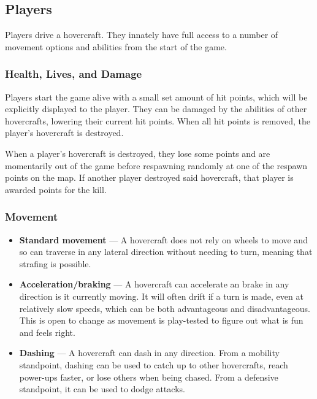 \documentclass{article}
\theoremstyle{definition}
\begin{document}
\subsection{Players}

Players drive a hovercraft. They innately have full access to a number of
movement options and abilities from the start of the game.

\subsubsection{Health, Lives, and Damage}

Players start the game alive with a small set amount of hit points, which will
be explicitly displayed to the player. They can be damaged by the abilities of
other hovercrafts, lowering their current hit points. When all hit points is
removed, the player's hovercraft is destroyed.

When a player's hovercraft is destroyed, they lose some points and are
momentarily out of the game before respawning randomly at one of the respawn
points on the map. If another player destroyed said hovercraft, that player is
awarded points for the kill.

\subsubsection{Movement}

\begin{itemize}
  \item \textbf{Standard movement} --- A hovercraft does not rely on wheels to
    move and so can traverse in any lateral direction without needing to turn,
    meaning that strafing is possible.
  \item \textbf{Acceleration/braking} --- A hovercraft can accelerate an brake
    in any direction is it currently moving. It will often drift if a turn is
    made, even at relatively slow speeds, which can be both advantageous and
    disadvantageous. This is open to change as movement is play-tested to
    figure out what is fun and feels right.
  \item \textbf{Dashing} --- A hovercraft can dash in any direction. From
    a mobility standpoint, dashing can be used to catch up to other
    hovercrafts, reach power-ups faster, or lose others when being chased. From
    a defensive standpoint, it can be used to dodge attacks.
\end{itemize}
\end{document}
